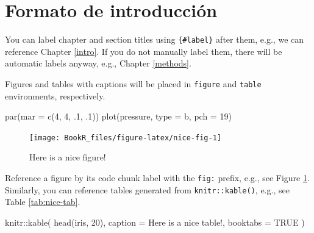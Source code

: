 \documentclass[
]{book}
\newenvironment{Shaded}{\begin{snugshade}}{\end{snugshade}}
\newcommand{\AttributeTok}[1]{\textcolor[rgb]{0.77,0.63,0.00}{#1}}
\newcommand{\ConstantTok}[1]{\textcolor[rgb]{0.00,0.00,0.00}{#1}}
\newcommand{\DecValTok}[1]{\textcolor[rgb]{0.00,0.00,0.81}{#1}}
\newcommand{\FunctionTok}[1]{\textcolor[rgb]{0.00,0.00,0.00}{#1}}
\newcommand{\NormalTok}[1]{#1}
\newcommand{\SpecialCharTok}[1]{\textcolor[rgb]{0.00,0.00,0.00}{#1}}
\newcommand{\StringTok}[1]{\textcolor[rgb]{0.31,0.60,0.02}{#1}}
\begin{document}
\hypertarget{formato-de-introducciuxf3n}{%
\section{Formato de introducción}\label{formato-de-introducciuxf3n}}

You can label chapter and section titles using \texttt{\{\#label\}} after them, e.g., we can reference Chapter \ref{intro}. If you do not manually label them, there will be automatic labels anyway, e.g., Chapter \ref{methods}.

Figures and tables with captions will be placed in \texttt{figure} and \texttt{table} environments, respectively.

\begin{Shaded}
\begin{Highlighting}[]
\FunctionTok{par}\NormalTok{(}\AttributeTok{mar =} \FunctionTok{c}\NormalTok{(}\DecValTok{4}\NormalTok{, }\DecValTok{4}\NormalTok{, .}\DecValTok{1}\NormalTok{, .}\DecValTok{1}\NormalTok{))}
\FunctionTok{plot}\NormalTok{(pressure, }\AttributeTok{type =} \StringTok{\textquotesingle{}b\textquotesingle{}}\NormalTok{, }\AttributeTok{pch =} \DecValTok{19}\NormalTok{)}
\end{Highlighting}
\end{Shaded}

\begin{figure}

{\centering \texttt{[image: BookR\_files/figure-latex/nice-fig-1]} 

}

\caption{Here is a nice figure!}\label{fig:nice-fig}
\end{figure}

Reference a figure by its code chunk label with the \texttt{fig:} prefix, e.g., see Figure \ref{fig:nice-fig}. Similarly, you can reference tables generated from \texttt{knitr::kable()}, e.g., see Table \ref{tab:nice-tab}.

\begin{Shaded}
\begin{Highlighting}[]
\NormalTok{knitr}\SpecialCharTok{::}\FunctionTok{kable}\NormalTok{(}
  \FunctionTok{head}\NormalTok{(iris, }\DecValTok{20}\NormalTok{), }\AttributeTok{caption =} \StringTok{\textquotesingle{}Here is a nice table!\textquotesingle{}}\NormalTok{,}
  \AttributeTok{booktabs =} \ConstantTok{TRUE}
\NormalTok{)}
\end{Highlighting}
\end{Shaded}
\end{document}
